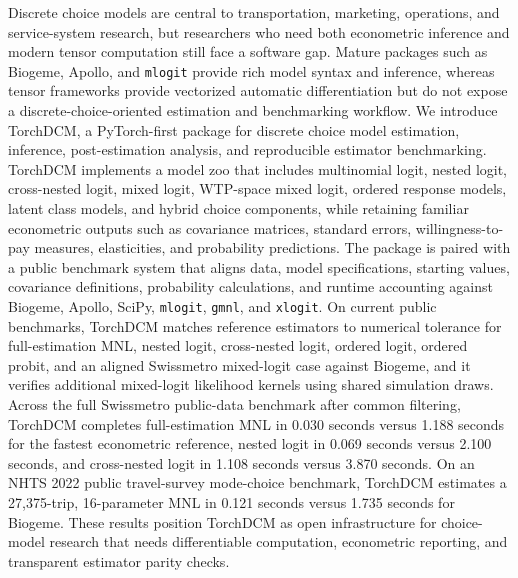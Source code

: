 Discrete choice models are central to transportation, marketing, operations, and service-system research, but researchers who need both econometric inference and modern tensor computation still face a software gap.
Mature packages such as Biogeme, Apollo, and \texttt{mlogit} provide rich model syntax and inference, whereas tensor frameworks provide vectorized automatic differentiation but do not expose a discrete-choice-oriented estimation and benchmarking workflow.
We introduce TorchDCM, a PyTorch-first package for discrete choice model estimation, inference, post-estimation analysis, and reproducible estimator benchmarking.
TorchDCM implements a model zoo that includes multinomial logit, nested logit, cross-nested logit, mixed logit, WTP-space mixed logit, ordered response models, latent class models, and hybrid choice components, while retaining familiar econometric outputs such as covariance matrices, standard errors, willingness-to-pay measures, elasticities, and probability predictions.
The package is paired with a public benchmark system that aligns data, model specifications, starting values, covariance definitions, probability calculations, and runtime accounting against Biogeme, Apollo, SciPy, \texttt{mlogit}, \texttt{gmnl}, and \texttt{xlogit}.
On current public benchmarks, TorchDCM matches reference estimators to numerical tolerance for full-estimation MNL, nested logit, cross-nested logit, ordered logit, ordered probit, and an aligned Swissmetro mixed-logit case against Biogeme, and it verifies additional mixed-logit likelihood kernels using shared simulation draws.
Across the full Swissmetro public-data benchmark after common filtering, TorchDCM completes full-estimation MNL in 0.030 seconds versus 1.188 seconds for the fastest econometric reference, nested logit in 0.069 seconds versus 2.100 seconds, and cross-nested logit in 1.108 seconds versus 3.870 seconds.
On an NHTS 2022 public travel-survey mode-choice benchmark, TorchDCM estimates a 27,375-trip, 16-parameter MNL in 0.121 seconds versus 1.735 seconds for Biogeme.
These results position TorchDCM as open infrastructure for choice-model research that needs differentiable computation, econometric reporting, and transparent estimator parity checks.
